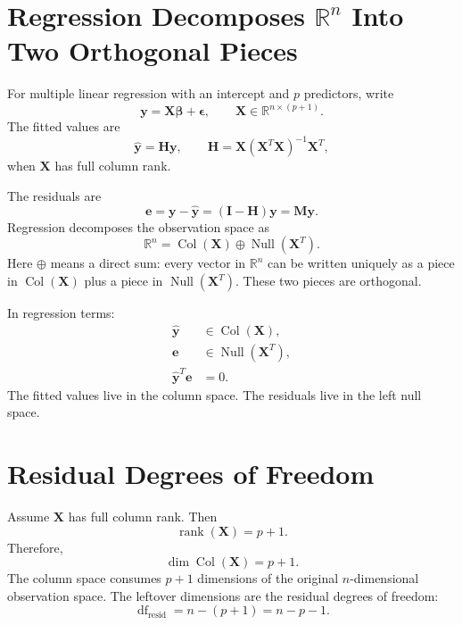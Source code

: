 \section{Regression Decomposes \texorpdfstring{\(\mathbb{R}^n\)}{R n} Into Two Orthogonal Pieces}

For multiple linear regression with an intercept and \(p\) predictors, write
\begin{equation}
  \mathbf{y}=\mathbf{X}\boldsymbol{\beta}+\boldsymbol{\epsilon},
  \qquad
  \mathbf{X}\in\mathbb{R}^{n\times(p+1)}.
\end{equation}
The fitted values are
\begin{equation}
  \widehat{\mathbf{y}}=\mathbf{H}\mathbf{y},
  \qquad
  \mathbf{H}=\mathbf{X}(\mathbf{X}^T\mathbf{X})^{-1}\mathbf{X}^T,
\end{equation}
when \(\mathbf{X}\) has full column rank.

The residuals are
\begin{equation}
  \mathbf{e}=\mathbf{y}-\widehat{\mathbf{y}}=(\mathbf{I}-\mathbf{H})\mathbf{y}=\mathbf{M}\mathbf{y}.
\end{equation}
Regression decomposes the observation space as
\begin{equation}
  \boxed{\mathbb{R}^n=\operatorname{Col}(\mathbf{X})\oplus \operatorname{Null}(\mathbf{X}^T).}
  \label{eq:ch8-column-leftnull-decomposition}
\end{equation}
Here \(\oplus\) means a direct sum: every vector in \(\mathbb{R}^n\) can be written uniquely as a piece in \(\operatorname{Col}(\mathbf{X})\) plus a piece in \(\operatorname{Null}(\mathbf{X}^T)\).  These two pieces are orthogonal.

In regression terms:
\begin{align}
  \widehat{\mathbf{y}} &\in \operatorname{Col}(\mathbf{X}), \\
  \mathbf{e} &\in \operatorname{Null}(\mathbf{X}^T), \\
  \widehat{\mathbf{y}}^T\mathbf{e} &=0.
\end{align}
The fitted values live in the column space.  The residuals live in the left null space.

\section{Residual Degrees of Freedom}

Assume \(\mathbf{X}\) has full column rank.  Then
\begin{equation}
  \operatorname{rank}(\mathbf{X})=p+1.
\end{equation}
Therefore,
\begin{equation}
  \dim \operatorname{Col}(\mathbf{X})=p+1.
\end{equation}
The column space consumes \(p+1\) dimensions of the original \(n\)-dimensional observation space.  The leftover dimensions are the residual degrees of freedom:
\begin{equation}
  \boxed{\operatorname{df}_{\text{resid}}=n-(p+1)=n-p-1.}
\end{equation}

